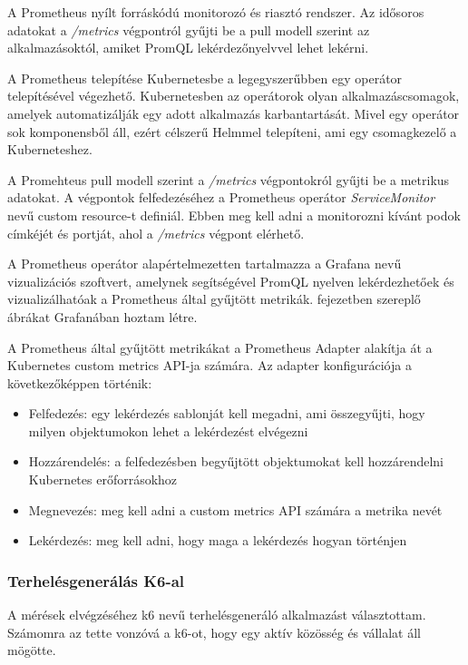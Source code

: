 \documentclass[a4paper,oneside]{article}
\begin{document}
A Prometheus nyílt forráskódú monitorozó és riasztó rendszer. Az idősoros
adatokat a \emph{/metrics} végpontról gyűjti be a pull modell szerint az
alkalmazásoktól, amiket PromQL \cite{promql} lekérdezőnyelvvel lehet lekérni. 

A Prometheus telepítése Kubernetesbe a legegyszerűbben egy operátor
\cite{operator} telepítésével végezhető. Kubernetesben az operátorok olyan
alkalmazáscsomagok, amelyek automatizálják egy adott alkalmazás karbantartását.
Mivel egy operátor sok komponensből áll, ezért célszerű Helmmel \cite{helm}
telepíteni, ami egy csomagkezelő a Kuberneteshez. 

A Promehteus pull modell szerint a \emph{/metrics} végpontokról gyűjti be a
metrikus adatokat. A végpontok felfedezéséhez a Prometheus operátor
\emph{ServiceMonitor} nevű custom resource-t \cite{custom-resource} definiál.
Ebben meg kell adni a monitorozni kívánt podok címkéjét és portját, ahol a
\emph{/metrics} végpont elérhető.

A Prometheus operátor alapértelmezetten tartalmazza a Grafana \cite{grafana}
nevű vizualizációs szoftvert, amelynek segítségével PromQL nyelven
lekérdezhetőek és vizualizálhatóak a Prometheus által gyűjtött metrikák.
 fejezetben szereplő ábrákat Grafanában hoztam
létre.

A Prometheus által gyűjtött metrikákat a Prometheus Adapter alakítja át a
Kubernetes custom metrics API-ja számára. Az adapter konfigurációja
\cite{prometheus-adapter-config} a következőképpen történik: 

\begin{itemize}
  \item Felfedezés: egy lekérdezés sablonját kell megadni, ami összegyűjti, hogy
  milyen objektumokon lehet a lekérdezést elvégezni
  \item Hozzárendelés: a felfedezésben begyűjtött objektumokat kell
  hozzárendelni Kubernetes erőforrásokhoz
  \item Megnevezés: meg kell adni a custom metrics API számára a metrika nevét
  \item Lekérdezés: meg kell adni, hogy maga a lekérdezés hogyan történjen
\end{itemize}

\subsubsection{Terhelésgenerálás K6-al}
\label{secsec:k6}

A mérések elvégzéséhez k6 \cite{k6} nevű terhelésgeneráló alkalmazást
választottam. Számomra az tette vonzóvá a k6-ot, hogy egy aktív közösség és
vállalat áll mögötte.
\end{document}
